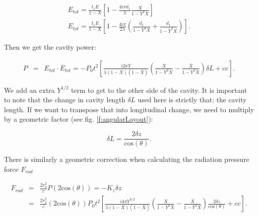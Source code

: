 \begin{eqnarray}
\label{e:Etot}
E_{tot} = \frac{t_1 E}{1-X}\left[ 1- \frac{4i\pi d_1}{\lambda}\frac{X}{1-Y^2X}\right]\nonumber\\
E_{tot} = \frac{t_1 E}{1-X}\left[ 1- \frac{4i\pi}{2\lambda}\left(\frac{ d_1}{1-Y^2X}+\frac{ \overline{d}_1}{1-\overline{Y}^2X}\right)\right].
\end{eqnarray}

Then we get the cavity power:

\begin{eqnarray}
\label{e:P}
P&=&E_{tot}\cdot \overline{E}_{tot}=-P_0 t^2\left[ \frac{i 2\pi Y}{\lambda(1-X)(1-\overline{X})}\left(\frac{X}{1-Y^2X}-\frac{\overline{X}}{1-Y^2\overline{X}}\right)\delta L+cc\right] .
\end{eqnarray}

We add an extra $Y^{1/2}$ term to get to the other side of the cavity.
It is important to note that the change in cavity length $\delta L$ used here is strictly that: the cavity length. If we want to transpose that into longitudinal change, we need to multiply by a geometric factor (see fig. \ref{f:angularLayout}):

\begin{equation}
\delta L = \frac{2 \delta z}{\mbox{cos}(\theta)}.
\label{e:deltaL}
\end{equation}

There is similarly a geometric correction when calculating the radiation pressure force $F_{rad}$

\begin{eqnarray}
F_{rad} &=& \frac{2r_2^2}{c} P (2 \mbox{cos}(\theta)) = -K_z \delta z\\
&=& \frac{2r_2^2}{c} (2 \mbox{cos}(\theta)) P_0 t^2\left[ \frac{i 4\pi Y^{3/2}}{\lambda(1-X)(1-\overline{X})}\left(\frac{X}{1-Y^2X}-\frac{\overline{X}}{1-Y^2\overline{X}}\right)\frac{2 \delta z}{\mbox{cos}(\theta)}+cc\right]. \nonumber
\label{e:Frad}
\end{eqnarray}

